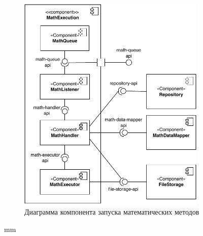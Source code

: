 \begin{figure}[H]
	\hspace*{-2.5 cm}\includegraphics[width=0.8\textwidth]{architecture/pictures/executor/component_detailed}
	\caption{Диаграмма компонента запуска математических методов}
	\label{pic:architecture__executor-detailed-component}
\end{figure}
 mm